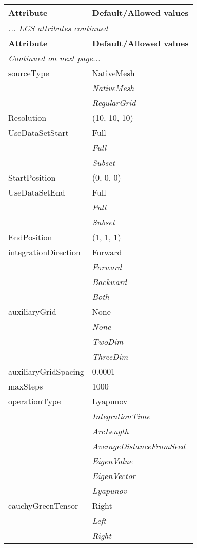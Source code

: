 \documentclass[10pt,a4paper]{report}
\begin{document}
\begin{longtable}{ll}
{\bf Attribute} & {\bf Default/Allowed values} \\
\hline \hline
\endfirsthead
\multicolumn{2}{l}{{\it ... LCS attributes continued}} \\
{\bf Attribute} & {\bf Default/Allowed values} \\
\hline \hline
\endhead
\hline
\multicolumn{2}{l}{{\it Continued on next page...}} \\
\endfoot
\hline
\endlastfoot

sourceType  &  NativeMesh   \\
 & {\it  NativeMesh} \\
 & {\it  RegularGrid} \\
Resolution  &  (10, 10, 10) \\
UseDataSetStart  &  Full   \\
 & {\it  Full} \\
 & {\it  Subset} \\
StartPosition  &  (0, 0, 0) \\
UseDataSetEnd  &  Full   \\
 & {\it  Full} \\
 & {\it  Subset} \\
EndPosition  &  (1, 1, 1) \\
integrationDirection  &  Forward   \\
 & {\it  Forward} \\
 & {\it  Backward} \\
 & {\it  Both} \\
auxiliaryGrid  &  None   \\
 & {\it  None} \\
 & {\it  TwoDim} \\
 & {\it  ThreeDim} \\
auxiliaryGridSpacing  &  0.0001 \\
maxSteps  &  1000 \\
operationType  &  Lyapunov   \\
 & {\it  IntegrationTime} \\
 & {\it  ArcLength} \\
 & {\it  AverageDistanceFromSeed} \\
 & {\it  EigenValue} \\
 & {\it  EigenVector} \\
 & {\it  Lyapunov} \\
cauchyGreenTensor  &  Right   \\
 & {\it  Left} \\
 & {\it  Right} \\

\end{longtable}
\end{document}
